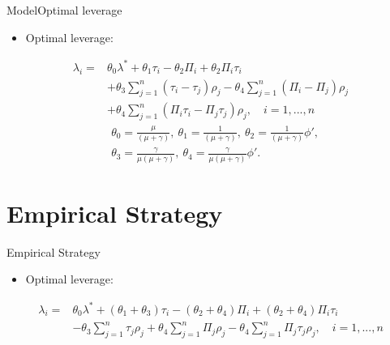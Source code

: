 \documentclass{beamer}
\begin{document}
\begin{frame}{Model}{Optimal leverage}
\begin{itemize}
	\item  Optimal leverage:
\end{itemize}
\begin{equation}
\begin{aligned}
\lambda_i = &\theta_0\lambda^*+\theta_1\tau_i-\theta_2\Pi_i+\theta_2\Pi_i\tau_{i}\\
&+\theta_3\sum_{j=1}^{n}(\tau_i-\tau_j)\rho_j-\theta_4\sum_{j=1}^{n}(\Pi_i-\Pi_j)\rho_j\\
&+\theta_4\sum_{j=1}^{n}(\Pi_i\tau_i-\Pi_j\tau_j)\rho_j, \quad i=1,...,n
\end{aligned}
\label{eq:optimal leverage in theory}
\end{equation}
\begin{equation*}
\begin{aligned}
&\theta_0=\frac{\mu}{(\mu+\gamma)}, \ \theta_1=\frac{1}{(\mu+\gamma)}, \
\theta_2=\frac{1}{(\mu+\gamma)}\phi', \\
&\theta_3=\frac{\gamma}{\mu(\mu+\gamma)}, \
\theta_4=\frac{\gamma}{\mu(\mu+\gamma)}\phi'.
\end{aligned}
\end{equation*}
\end{frame}



\section{Empirical Strategy}
\begin{frame}{Empirical Strategy}
\begin{itemize}
	\item  Optimal leverage:
\end{itemize}
\begin{equation}
\begin{aligned}
\lambda_i = &\theta_0\lambda^*+(\theta_1+\theta_3)\tau_i-(\theta_2+\theta_4)\Pi_i+(\theta_2+\theta_4)\Pi_i\tau_{i}\\
&-\theta_3\sum_{j=1}^{n}\tau_j\rho_j+\theta_4\sum_{j=1}^{n}\Pi_j\rho_j-\theta_4\sum_{j=1}^{n}\Pi_j\tau_j\rho_j, \quad i=1,...,n
\end{aligned}
\label{eq:optimal leverage in theory 2}
\end{equation}

\end{frame}
\end{document}
